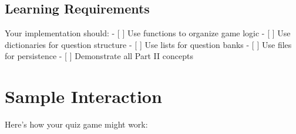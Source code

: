 \documentclass[
  letterpaper,
  DIV=11,
  numbers=noendperiod,
  oneside]{scrreprt}
\begin{document}
\subsection{Learning Requirements}\label{learning-requirements-7}

Your implementation should: - {[} {]} Use functions to organize game
logic - {[} {]} Use dictionaries for question structure - {[} {]} Use
lists for question banks - {[} {]} Use files for persistence - {[} {]}
Demonstrate all Part II concepts

\section{Sample Interaction}\label{sample-interaction-7}

Here's how your quiz game might work:
\end{document}
